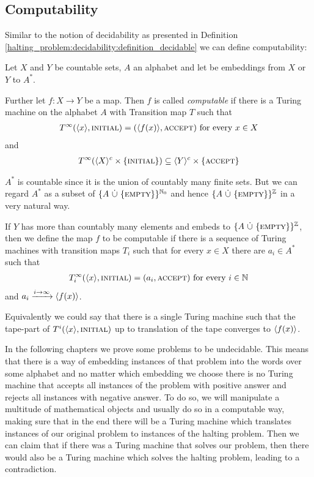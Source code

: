 \subsection{Computability}
\label{halting_problem:computability}

Similar to the notion of decidability as presented in Definition \ref{halting_problem:decidability:definition_decidable} we can define computability:

\begin{Definition}
	Let $X$ and $Y$ be countable sets, $A$ an alphabet and let \emb{\cdot} be embeddings from $X$ or $Y$ to $A^*$.

	Further let $f:X \to Y$ be a map.
	Then $f$ is called \emph{computable} if there is a Turing machine on the alphabet $A$ with Transition map $T$ such that
	\begin{align*}
		T^\infty(\langle x \rangle,\text{\scshape{initial}}) = (\langle f(x) \rangle,\text{\scshape{accept}}) ~\text{for every}~ x \in X
	\end{align*}
	and
	\begin{align*}
		T^\infty(\langle X \rangle^c \times \{\text{\scshape{initial}}\}) \subseteq \langle Y \rangle^c \times \{\text{\scshape{accept}}\}
	\end{align*}
\end{Definition}

\begin{Remark}
	$A^*$ is countable since it is the union of countably many finite sets.
	But we can regard $A^*$ as a subset of $\{A ~\dot\cup~ \{\text{\scshape{empty}}\}\}^{\mathbb{N}_0}$ and hence $\{A ~\dot\cup~ \{\text{\scshape{empty}}\}\}^{\mathbb{Z}}$ in a very natural way.

	If $Y$ has more than countably many elements and embeds to $\{A ~\dot\cup~ \{\text{\scshape{empty}}\}\}^{\mathbb{Z}}$, then we define the map $f$ to be computable if there is a sequence of Turing machines with transition maps $T_i$ such that for every $x \in X$ there are $a_i \in A^*$ such that
	\begin{align*}
		T_i^\infty(\langle x \rangle, \text{\scshape{initial}}) = (a_i,\text{\scshape{accept}}) ~\text{for every}~ i \in \mathbb{N}
	\end{align*}
	and $a_i \xrightarrow{i \to \infty} \langle f(x) \rangle$.

	Equivalently we could say that there is a single Turing machine such that the tape-part of $T^i(\langle x \rangle,\text{\scshape{initial}})$ up to translation of the tape converges to $\langle f(x) \rangle$.
\end{Remark}

In the following chapters we prove some problems to be undecidable.
This means that there is a way of embedding instances of that problem into the words over some alphabet and no matter which embedding we choose there is no Turing machine that accepts all instances of the problem with positive answer and rejects all instances with negative answer.
To do so, we will manipulate a multitude of mathematical objects and usually do so in a computable way, making sure that in the end there will be a Turing machine which translates instances of our original problem to instances of the halting problem.
Then we can claim that if there was a Turing machine that solves our problem, then there would also be a Turing machine which solves the halting problem, leading to a contradiction.

